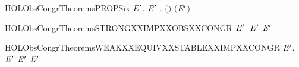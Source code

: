 \newcommand{\HOLObsCongrTheoremsOBSXXCONGRXXWEAKXXTRANSYY}{\UseVerbatim{HOLObsCongrTheoremsOBSXXCONGRXXWEAKXXTRANSYY}}
\begin{SaveVerbatim}{HOLObsCongrTheoremsPROPSix}
\HOLTokenTurnstile{} \HOLSymConst{\HOLTokenForall{}} \ensuremath{\HOLBoundVar{E}\sp{\prime}}.   \ensuremath{\HOLBoundVar{E}\sp{\prime}} \HOLSymConst{\HOLTokenImp{}} \HOLSymConst{\HOLTokenForall{}}.  \ensuremath{(}\HOLSymConst{\ensuremath{\ldotp}}\ensuremath{)} \ensuremath{(}\HOLSymConst{\ensuremath{\ldotp}}\ensuremath{\HOLBoundVar{E}\sp{\prime}}\ensuremath{)}
\end{SaveVerbatim}
\newcommand{\HOLObsCongrTheoremsPROPSix}{\UseVerbatim{HOLObsCongrTheoremsPROPSix}}
\begin{SaveVerbatim}{HOLObsCongrTheoremsSTRONGXXIMPXXOBSXXCONGR}
\HOLTokenTurnstile{} \HOLSymConst{\HOLTokenForall{}} \ensuremath{\HOLBoundVar{E}\sp{\prime}}.   \ensuremath{\HOLBoundVar{E}\sp{\prime}} \HOLSymConst{\HOLTokenImp{}}   \ensuremath{\HOLBoundVar{E}\sp{\prime}}
\end{SaveVerbatim}
\newcommand{\HOLObsCongrTheoremsSTRONGXXIMPXXOBSXXCONGR}{\UseVerbatim{HOLObsCongrTheoremsSTRONGXXIMPXXOBSXXCONGR}}
\begin{SaveVerbatim}{HOLObsCongrTheoremsWEAKXXEQUIVXXSTABLEXXIMPXXCONGR}
\HOLTokenTurnstile{} \HOLSymConst{\HOLTokenForall{}} \ensuremath{\HOLBoundVar{E}\sp{\prime}}.
         \ensuremath{\HOLBoundVar{E}\sp{\prime}} \HOLSymConst{\HOLTokenConj{}}   \HOLSymConst{\HOLTokenConj{}}  \ensuremath{\HOLBoundVar{E}\sp{\prime}} \HOLSymConst{\HOLTokenImp{}}   \ensuremath{\HOLBoundVar{E}\sp{\prime}}
\end{SaveVerbatim}
\newcommand{\HOLObsCongrTheoremsWEAKXXEQUIVXXSTABLEXXIMPXXCONGR}{\UseVerbatim{HOLObsCongrTheoremsWEAKXXEQUIVXXSTABLEXXIMPXXCONGR}}
